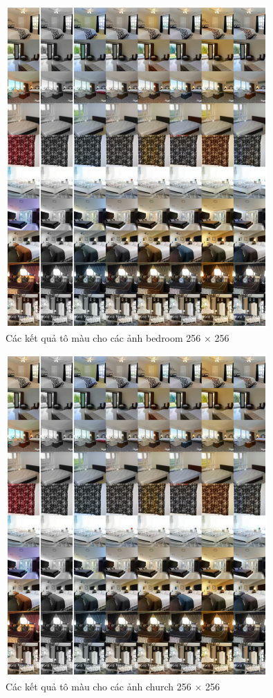 \documentclass{article} %
\begin{document}
\begin{figure}[h!]
    \centering
    \includegraphics[width=0.8\linewidth]{figures/16.png}
    \caption{Các kết quả tô màu cho các ảnh bedroom 256 $\times$ 256}
    \label{fig:16}
\end{figure}

\begin{figure}[h!]
    \centering
    \includegraphics[width=0.8\linewidth]{figures/16.png}
    \caption{Các kết quả tô màu cho các ảnh church 256 $\times$ 256}
    \label{fig:17}
\end{figure}
\end{document}
